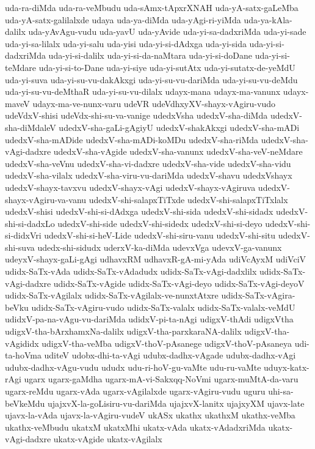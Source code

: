 {uda-ra-diMda
uda-ra-veMbudu
uda-sAmx-tApxrXNAH
uda-yA-satx-gaLeMba
uda-yA-satx-galilalxde
udaya
uda-ya-diMda
uda-yAgi-ri-yiMda
uda-ya-kAla-dalilx
uda-yAvAgu-vudu
uda-yavU
uda-yAvide
uda-yi-sa-dadxriMda
uda-yi-sade
uda-yi-sa-lilalx
uda-yi-salu
uda-yisi
uda-yi-si-dAdxga
uda-yi-sida
uda-yi-si-dadxriMda
uda-yi-si-dalilx
uda-yi-si-da-naMtara
uda-yi-si-doDane
uda-yi-si-teMdare
uda-yi-si-to-Dane
uda-yi-siye
uda-yi-sutAtx
uda-yi-sutatx-de-yeMdU
uda-yi-suva
uda-yi-su-vu-dakAkxgi
uda-yi-su-vu-dariMda
uda-yi-su-vu-deMdu
uda-yi-su-vu-deMthaR
uda-yi-su-vu-dilalx
udayx-mana
udayx-ma-vanunx
udayx-maveV
udayx-ma-ve-nunx-varu
udeVR
udeVdhxyXV-shayx-vAgiru-vudo
udeVdxV-shisi
udeVdx-shi-su-va-vanige
udedxVsha
udedxV-sha-diMda
udedxV-sha-diMdaleV
udedxV-sha-gaLi-gAgiyU
udedxV-shakAkxgi
udedxV-sha-mADi
udedxV-sha-mADide
udedxV-sha-mADi-koMDu
udedxV-sha-riMda
udedxV-sha-vAgi-dadxre
udedxV-sha-vAgide
udedxV-sha-vanunx
udedxV-sha-veV-neMdare
udedxV-sha-veVnu
udedxV-sha-vi-dadxre
udedxV-sha-vide
udedxV-sha-vidu
udedxV-sha-vilalx
udedxV-sha-viru-vu-dariMda
udedxV-shavu
udedxVshayx
udedxV-shayx-tavxvu
udedxV-shayx-vAgi
udedxV-shayx-vAgiruva
udedxV-shayx-vAgiru-va-vanu
udedxV-shi-salapxTiTxde
udedxV-shi-salapxTiTxlalx
udedxV-shisi
udedxV-shi-si-dAdxga
udedxV-shi-sida
udedxV-shi-sidadx
udedxV-shi-si-dadxLo
udedxV-shi-side
udedxV-shi-sidedx
udedxV-shi-si-deyo
udedxV-shi-si-didxVri
udedxV-shi-si-heV-Lide
udedxV-shi-siru-vanu
udedxV-shi-situ
udedxV-shi-suva
udedx-shi-sidudx
uderxV-ka-diMda
udevxVga
udevxV-ga-vanunx
udeyxV-shayx-gaLi-gAgi
udhavxRM
udhavxR-gA-mi-yAda
udiVcAyxM
udiVciV
udidx-SaTx-vAda
udidx-SaTx-vAdadudx
udidx-SaTx-vAgi-dadxlilx
udidx-SaTx-vAgi-dadxre
udidx-SaTx-vAgide
udidx-SaTx-vAgi-deyo
udidx-SaTx-vAgi-deyoV
udidx-SaTx-vAgilalx
udidx-SaTx-vAgilalx-ve-nunxtAtxre
udidx-SaTx-vAgira-beVku
udidx-SaTx-vAgiru-vudo
udidx-SaTx-valalx
udidx-SaTx-valalx-veMdU
udidxV-pa-na-vAgu-vu-dariMda
udidxV-pi-ta-nAgi
udigxV-thAdi
udigxVtha
udigxV-tha-bArxhamxNa-dalilx
udigxV-tha-parxkaraNA-dalilx
udigxV-tha-vAgididx
udigxV-tha-veMba
udigxV-thoV-pAsanege
udigxV-thoV-pAsaneya
udi-ta-hoVma
uditeV
udobx-dhi-ta-vAgi
udubx-dadhx-vAgade
udubx-dadhx-vAgi
udubx-dadhx-vAgu-vudu
ududx
udu-ri-hoV-gu-vaMte
udu-ru-vaMte
uduyx-katx-rAgi
ugarx
ugarx-gaMdha
ugarx-mA-vi-Sakxqq-NoVmi
ugarx-muMtA-da-varu
ugarx-reMdu
ugarx-vAda
ugarx-vAgilalxde
ugarx-vAgiru-vudu
uguru
uhi-sa-beVkeMdu
ujajxvX-la-goLisiru-vu-dariMda
ujajxvX-lanitx
ujajxyXM
ujavx-late
ujavx-la-vAda
ujavx-la-vAgiru-vudeV
ukASx
ukathx
ukathxM
ukathx-veMba
ukathx-veMbudu
ukatxM
ukatxMhi
ukatx-vAda
ukatx-vAdadxriMda
ukatx-vAgi-dadxre
ukatx-vAgide
ukatx-vAgilalx
}

